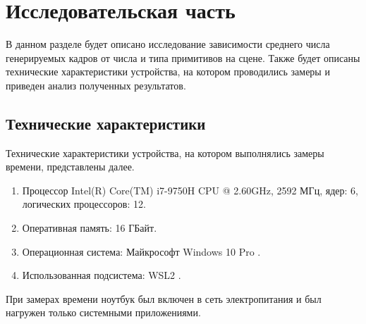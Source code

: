 \chapter{Исследовательская часть}


В данном разделе будет описано исследование зависимости среднего числа генерируемых кадров от числа и типа примитивов на сцене. Также будет описаны технические характеристики устройства, на котором проводились замеры и приведен анализ полученных результатов.

\section{Технические характеристики}

Технические характеристики устройства, на котором выполнялись замеры времени, представлены далее.

\begin{enumerate}
	\item Процессор	Intel(R) Core(TM) i7-9750H CPU @ 2.60GHz, 2592 МГц, ядер: 6, логических процессоров: 12.
	\item Оперативная память: 16 ГБайт.
	\item Операционная система: Майкрософт Windows 10 Pro \cite{windows}.
	\item Использованная подсистема: WSL2 \cite{WSL2}.
\end{enumerate}

При замерах времени ноутбук был включен в сеть электропитания и был нагружен только системными приложениями.
